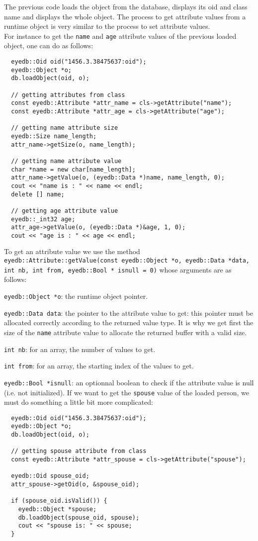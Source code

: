 \normalsize
The previous code loads the object from the database, displays its
oid and class name and displays the whole object.
The process to get attribute values from a runtime object is very similar
to the process to set attribute values.
\\
For instance to get the \texttt{name} and \texttt{age} attribute values of
the previous loaded object, one can do as follows:
\verbsize
\begin{verbatim}
  eyedb::Oid oid("1456.3.38475637:oid");
  eyedb::Object *o;
  db.loadObject(oid, o);

  // getting attributes from class
  const eyedb::Attribute *attr_name = cls->getAttribute("name");
  const eyedb::Attribute *attr_age = cls->getAttribute("age");

  // getting name attribute size
  eyedb::Size name_length;
  attr_name->getSize(o, name_length);

  // getting name attribute value
  char *name = new char[name_length];
  attr_name->getValue(o, (eyedb::Data *)name, name_length, 0);
  cout << "name is : " << name << endl;
  delete [] name;

  // getting age attribute value
  eyedb::_int32 age;
  attr_age->getValue(o, (eyedb::Data *)&age, 1, 0);
  cout << "age is : " << age << endl;
\end{verbatim}
\normalsize
To get an attribute value we use the method
\texttt{eyedb::Attribute::getValue(const eyedb::Object *o, eyedb::Data *data,
int nb, int from, eyedb::Bool * isnull = 0)} whose arguments are as follows:
\be
\item \texttt{eyedb::Object *o}: the runtime object pointer.
\item \texttt{eyedb::Data data}: the pointer to the attribute value to get: this
pointer must be allocated correctly according to the returned value type.
It is why we get first the size of the \texttt{name} attribute value to allocate
the returned buffer with a valid size.
\item \texttt{int nb}: for an array, the number of values to get.
\item \texttt{int from}: for an array, the starting index of the values to get.
\item \texttt{eyedb::Bool *isnull}: an optionnal boolean to check if the attribute
value is null (i.e. not initialized).
\ee
If we want to get the \texttt{spouse} value of the loaded person,
we must do something a little bit more complicated:
\verbsize
\begin{verbatim}
  eyedb::Oid oid("1456.3.38475637:oid");
  eyedb::Object *o;
  db.loadObject(oid, o);

  // getting spouse attribute from class
  const eyedb::Attribute *attr_spouse = cls->getAttribute("spouse");

  eyedb::Oid spouse_oid;
  attr_spouse->getOid(o, &spouse_oid);

  if (spouse_oid.isValid()) {
    eyedb::Object *spouse;
    db.loadObject(spouse_oid, spouse);
    cout << "spouse is: " << spouse;
  }
\end{verbatim}
